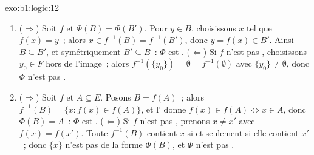 \begin{solution}{exo:b1:logic:12}
\begin{enumerate}
  \item ($\Rightarrow$) Soit $f$  et $\Phi(B) = \Phi(B')$.
        Pour $y \in B$, choisissons $x$ tel que $f(x) = y$~; alors $x
        \in f^{-1}(B) = f^{-1}(B')$, donc $y = f(x) \in B'$. Ainsi $B
        \subseteq B'$, et symétriquement $B' \subseteq B$~: $\Phi$ est
        . ($\Leftarrow$) Si $f$ n'est pas ,
        choisissons $y_0 \in F$ hors de l'image~; alors
        $f^{-1}(\{y_0\}) = \emptyset = f^{-1}(\emptyset)$ avec
        $\{y_0\} \neq \emptyset$, donc $\Phi$ n'est pas .
  \item ($\Rightarrow$) Soit $f$  et $A \subseteq E$. Posons
        $B = f(A)$~; alors $f^{-1}(B) = \{x : f(x) \in f(A)\}$, et
        l' donne $f(x) \in f(A) \iff x \in A$, donc
        $\Phi(B) = A$~: $\Phi$ est . ($\Leftarrow$) Si $f$
        n'est pas , prenons $x \neq x'$ avec $f(x) = f(x')$.
        Toute  $f^{-1}(B)$ contient $x$ si et seulement
        si elle contient $x'$~; donc $\{x\}$ n'est pas de la forme
        $\Phi(B)$, et $\Phi$ n'est pas .
\end{enumerate}
\end{solution}

